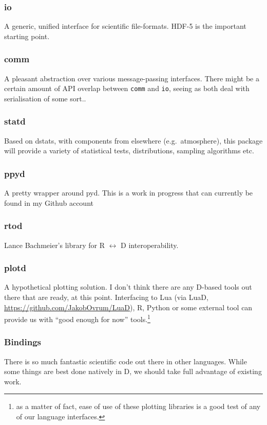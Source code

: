 \documentclass[10pt,a5paper,DIV=13]{scrartcl}
\begin{document}
\subsubsection*{io}
A generic, unified interface for scientific file-formats. HDF-5 is the important starting point.

\subsubsection*{comm}
A pleasant abstraction over various message-passing interfaces. There might be a certain amount of API overlap between \texttt{comm} and \texttt{io}, seeing as both deal with serialisation of some sort..

\subsubsection*{statd}
Based on dstats, with components from elsewhere (e.g.\ atmosphere), this package will provide a variety of statistical tests, distributions, sampling algorithms etc.

\subsubsection*{ppyd}
A pretty wrapper around pyd. This is a work in progress that can currently be found in my Github account

\subsubsection*{rtod}
Lance Bachmeier's library for R $\leftrightarrow$ D interoperability.

\subsubsection*{plotd}
A hypothetical plotting solution. I don't think there are any D-based tools out there that are ready, at this point. Interfacing to Lua (via LuaD, \url{https://github.com/JakobOvrum/LuaD}), R, Python or some external tool can provide us with ``good enough for now'' tools.\footnote{as a matter of fact, ease of use of these plotting libraries is a good test of any of our language interfaces.}

\subsubsection*{Bindings}
There is so much fantastic scientific code out there in other languages. While some things are best done natively in D, we should take full advantage of existing work.
\end{document}
